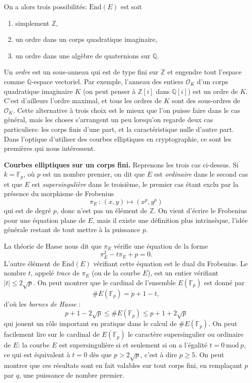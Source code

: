 \documentclass[11pt,a4paper]{article}
\newcommand{\Z}{\mathbb{Z}}
\newcommand{\F}{\mathbb{F}}
\newcommand{\Q}{\mathbb{Q}}
\renewcommand{\O}{\mathcal{O}}
\newcommand{\End}{\mathrm{End}}
\newcommand{\de}{\,:\,}
\renewcommand{\mod}{\ \mathrm{mod}\ }
\renewcommand{\v}{\vspace{5mm}}
\theoremstyle{definition}
\begin{document}
On a alors trois possibilités: $\End(E)$ est soit
\begin{enumerate} 
\item simplement $\Z$, 
\item un ordre dans un corps quadratique imaginaire,
\item un ordre dans une algèbre de quaternions sur $\Q$. 
\end{enumerate}
Un \emph{ordre} est un sous-anneau qui est de type fini sur $\Z$ et engendre tout l'espace comme $\Q$-espace vectoriel. Par exemple, l'anneau des entiers $\O_K$ d'un corps quadratique imaginaire $K$ (on peut penser à $\Z[i]$ dans $\Q[i]$) est un ordre de $K$. C'est d'ailleurs l'ordre maximal, et tous les ordres de $K$ sont des sous-ordres de $\O_K$. Cette alternative à trois choix est le mieux que l'on puisse faire dans le cas général, mais les choses s'arrangent un peu lorsqu'on regarde deux cas particuliers: les corps finis d'une part, et la caractéristique nulle d'autre part. Dans l'optique d'utiliser des courbes elliptiques en cryptographie, ce sont les premières qui nous intéressent.

\v

\textbf{Courbes elliptiques sur un corps fini.} Reprenons les trois cas ci-dessus. Si $k = \F_p$, où $p$ est un nombre premier, on dit que $E$ est \emph{ordinaire} dans le second cas et que $E$ est \emph{supersingulière} dans le troisième, le premier cas étant exclu par la présence du morphisme de Frobenius
$$\pi_E\de (x,y)\mapsto (x^p, y^p)$$
qui est de degré $p$,
donc n'est pas un élément de $\Z$. On vient d'écrire le Frobenius pour une équation plane de $E$, mais il existe une définition plus intrinsèque, l'idée générale restant de tout mettre à la puissance $p$.

La théorie de Hasse nous dit que $\pi_E$ vérifie une équation de la forme
$$\pi_E^2 - t \pi_E + p = 0.$$
L'autre élément de $\End(E)$ vérifiant cette équation est le dual du Frobenius.
Le nombre $t$, appelé \emph{trace} de $\pi_E$ (ou de la courbe $E$), est un entier vérifiant $|t|\leq 2\sqrt{p}$. On peut montrer que le cardinal de l'ensemble $E(\F_p)$ est donné par
$$\# E(\F_p) = p + 1 - t,$$
d'où les \emph{bornes de Hasse} :
$$p + 1 - 2\sqrt{p} \leq \#E(\F_p) \leq p + 1 + 2\sqrt{p}$$
qui jouent un rôle important en pratique dans le calcul de $\# E(\F_p)$. On peut facilement lire sur le cardinal de $E(\F_p)$ le caractère supersingulier ou ordinaire de $E$: la courbe $E$ est supersingulière si et seulement si on a l'égalité $t = 0 \mod p$, ce qui est équivalent à $t=0$ dès que $p > 2\sqrt{p}$, c'est à dire $p \geq 5$. On peut montrer que ces résultats sont en fait valables sur tout corps fini, en remplaçant $p$ par $q$, une puissance de nombre premier.
\end{document}
